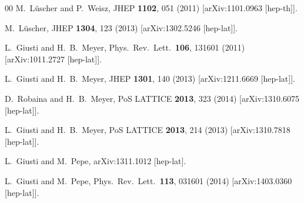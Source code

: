 \begin{thebibliography}{00}
  M.~L\"uscher and P.~Weisz,
  JHEP {\bf 1102}, 051 (2011)
  [arXiv:1101.0963 [hep-th]].

  M.~L\"uscher,
  JHEP {\bf 1304}, 123 (2013)
  [arXiv:1302.5246 [hep-lat]].

  L.~Giusti and H.~B.~Meyer,
  Phys.\ Rev.\ Lett.\  {\bf 106}, 131601 (2011)
  [arXiv:1011.2727 [hep-lat]].

  L.~Giusti and H.~B.~Meyer,
  JHEP {\bf 1301}, 140 (2013)
  [arXiv:1211.6669 [hep-lat]].

  D.~Robaina and H.~B.~Meyer,
  PoS LATTICE {\bf 2013}, 323 (2014)
  [arXiv:1310.6075 [hep-lat]].

  L.~Giusti and H.~B.~Meyer,
  PoS LATTICE {\bf 2013}, 214 (2013)
  [arXiv:1310.7818 [hep-lat]].

  L.~Giusti and M.~Pepe,
  arXiv:1311.1012 [hep-lat].

  L.~Giusti and M.~Pepe,
  Phys.\ Rev.\ Lett.\  {\bf 113}, 031601 (2014)
  [arXiv:1403.0360 [hep-lat]].


\end{thebibliography}
